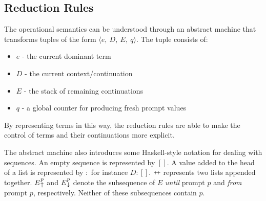   \begin{figure}[!h]
  \end{figure}

  \subsection{Reduction Rules}
  
  The operational semantics can be understood through an abstract machine that transforms tuples of the form $\langle e,\ D,\ E,\ q \rangle$.
  The tuple consists of:
    \begin{itemize}
      \item $e$ - the current dominant term
      \item $D$ - the current context/continuation
      \item $E$ - the stack of remaining continuations
      \item $q$ - a global counter for producing fresh prompt values
    \end{itemize}
  By representing terms in this way, 
  the reduction rules are able to make the control of terms and their continuations more explicit.
  
  The abstract machine also introduces some Haskell-style notation for dealing with sequences. An empty sequence is represented by $[]$. 
  A value added to the head of a list is represented by $:$ for instance $D:[]$. $\app$ represents two lists appended together. 
  $E\until{p}$ and $E\from{p}$ denote the subsequence of $E$ \emph{until} prompt $p$ and \emph{from} prompt $p$, respectively. 
  Neither of these subsequences contain $p$.

